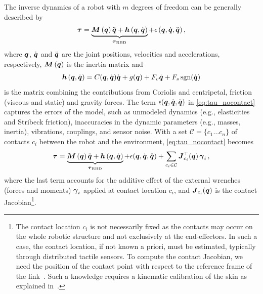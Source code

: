 The inverse dynamics of a robot with $m$ degrees of freedom can be generally described by 
%
\begin{align}
	\boldsymbol{\tau} = \underbrace{\boldsymbol M \left( \boldsymbol q \right)\ddot{\boldsymbol q} + \boldsymbol{h} \left(\boldsymbol q,\dot{\boldsymbol q} \right)}_{\boldsymbol{\tau}_\text{RBD}} + \epsilon\,(\boldsymbol q,\dot{\boldsymbol q},\ddot{\boldsymbol q}) \,,
	\label{eq:tau_nocontact}
\end{align}
%
where $\boldsymbol q$, $\dot{\boldsymbol q}$ and $\ddot{\boldsymbol q}$ are  the joint positions, velocities and accelerations, respectively, 
$\boldsymbol M \left( \boldsymbol q \right)$ is the inertia matrix and 
%
\begin{align*}
	\Hmatrix = C(\q,\dq)\dq + g(\q) + F_v \dq + F_s \,\text{sgn}(\dq) %
\end{align*}
%
is the matrix combining the contributions from Coriolis and centripetal, friction (viscous and static) and gravity forces.
The term $\epsilon(\boldsymbol q,\dot{\boldsymbol q},\ddot{\boldsymbol q})$ in \eq\eqref{eq:tau_nocontact} captures the errors of the model,
such as unmodeled dynamics (e.g., elasticities and Stribeck friction), inaccuracies in the dynamic parameters (e.g., masses, inertia), vibrations, couplings, and sensor noise. 
%
With a set $\mathcal{C}=\{c_1 \ldots c_n\}$ of contacts $c_i$ between the robot and the environment, \eq\eqref{eq:tau_nocontact} becomes
%
\begin{align}
	\boldsymbol{\tau} = \underbrace{\boldsymbol M \left( \boldsymbol q \right)\ddot{\boldsymbol q} + \boldsymbol{h} \left(\boldsymbol q,\dot{\boldsymbol q} \right)}_{\boldsymbol{\tau}_\text{RBD}} + \epsilon(\boldsymbol q,\dot{\boldsymbol q},\ddot{\boldsymbol q}) + \sum_{c_i \in\mathcal{C}} {\boldsymbol J^\top_{c_i}(\boldsymbol q)}\, \boldsymbol{\gamma}_i \, ,
	\label{eq:tau_contact}
\end{align}
%
where the last term accounts for the additive effect of the external wrenches (forces and moments) $\boldsymbol{\gamma}_i$ applied at contact location $c_i$, and $\boldsymbol J_{c_i}(\boldsymbol q)$  is the contact Jacobian\footnote{The contact location $c_i$ is not necessarily fixed as the contacts may occur on the whole robotic structure and not exclusively at the end-effectors. 
In such a case, the contact location, if not known a priori, must be estimated, typically through distributed tactile sensors.
To compute the contact Jacobian, we need the position of the contact point with respect to the reference frame of the link~\cite{Fumagalli2012}. Such a knowledge requires a kinematic calibration of the skin as explained in~\cite{DelPrete2011}.}.
%



